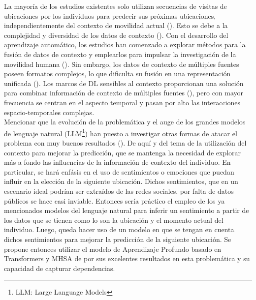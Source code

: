 La mayoría de los estudios existentes solo utilizan secuencias de 
visitas de ubicaciones por los individuos para predecir sus 
próximas ubicaciones, independientemente del contexto de movilidad 
actual (\cite{laha2018real}). Esto se debe a la complejidad y 
diversidad de los datos de contexto (\cite{tedjopurnomo2020survey}). 
Con el desarrollo del aprendizaje automático, los estudios han 
comenzado a explorar métodos para la fusión de datos de contexto y 
emplearlos para impulsar la investigación de la movilidad humana 
(\cite{zheng2018survey,lau2019survey}). Sin embargo, los datos de 
contexto de múltiples fuentes poseen formatos complejos, lo que 
dificulta su fusión en una representación unificada (\cite{liao2018multi}). 
Los marcos de DL sensibles al contexto proporcionan 
una solución para combinar información de contexto de múltiples fuentes 
(\cite{sun2022tcsanet}), pero con mayor frecuencia se centran en el aspecto 
temporal y pasan por alto las interacciones espacio-temporales complejas.\\

Mencionar que la evoluci\'on de la problem\'atica y el auge de los grandes modelos de lenguaje natural (LLM\footnote{LLM: Large Language Models})
han puesto a investigar otras formas de atacar el problema con muy buenos resultados (\cite{wang2024inextlargelanguage}).
De aqu\'i y del tema de la utilizaci\'on del contexto para mejorar la predicci\'on, que se mantenga la necesidad de explorar
m\'as a fondo las influencias de la informaci\'on de contexto del individuo. En particular, se har\'a
enf\'asis en el uso de sentimientos
o emociones que puedan influir en la elecci\'on de la siguiente ubicaci\'on. 
Dichos sentimientos, que en un escenario ideal podr\'ian ser extra\'idos de las redes sociales, 
por falta de datos p\'ublicos se hace casi inviable. Entonces ser\'ia pr\'actico el empleo de los ya 
mencionados modelos del lenguaje natural para inferir un sentimiento 
a partir de los datos que se tienen como lo son la ubicaci\'on y el momento actual del individuo.
Luego, queda hacer uso de un modelo en que 
se tengan en cuenta dichos sentimientos para mejorar la predicci\'on de la siguiente ubicaci\'on.
Se propone entonces utilizar el modelo de Aprendizaje Profundo basado en Transformers y MHSA de \cite{Hong_2023} 
por sus excelentes resultados en esta problem\'atica y su capacidad 
de capturar dependencias.